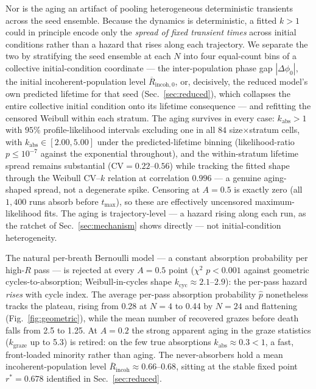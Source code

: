 \documentclass[pdflatex,sn-mathphys,Numbered]{sn-jnl}
\begin{document}
Nor is the aging an artifact of pooling heterogeneous deterministic transients
across the seed ensemble. Because the dynamics is deterministic, a fitted $k > 1$
could in principle encode only the \emph{spread of fixed transient times} across
initial conditions rather than a hazard that rises along each trajectory. We
separate the two by stratifying the seed ensemble at each $N$ into four
equal-count bins of a collective initial-condition coordinate --- the
inter-population phase gap $|\Delta\phi_0|$, the initial incoherent-population
level $\overline{R}_{\mathrm{incoh},0}$, or, decisively, the reduced model's own
predicted lifetime for that seed (Sec.~\ref{sec:reduced}), which collapses the
entire collective initial condition onto its lifetime consequence --- and
refitting the censored Weibull within each stratum. The aging survives in every
case: $k_{\mathrm{abs}} > 1$ with $95\%$ profile-likelihood intervals excluding
one in all $84$ size$\times$stratum cells, with
$k_{\mathrm{abs}} \in [2.00, 5.00]$ under the predicted-lifetime binning
(likelihood-ratio $p \le 10^{-7}$ against the exponential throughout), and the
within-stratum lifetime spread remains substantial
($\mathrm{CV} = 0.22$--$0.56$) while tracking the fitted shape through the
Weibull CV--$k$ relation at correlation $0.996$ --- a genuine aging-shaped spread,
not a degenerate spike. Censoring at $A = 0.5$ is exactly zero (all $1{,}400$
runs absorb before $t_{\max}$), so these are effectively uncensored
maximum-likelihood fits. The aging is trajectory-level --- a hazard rising along
each run, as the ratchet of Sec.~\ref{sec:mechanism} shows directly --- not
initial-condition heterogeneity.

The natural per-breath Bernoulli model
--- a constant absorption probability per high-$R$ pass --- is rejected at every
$A = 0.5$ point ($\chi^2$ $p < 0.001$ against geometric cycles-to-absorption;
Weibull-in-cycles shape $k_{\mathrm{cyc}} \approx 2.1$--$2.9$): the per-pass hazard
\emph{rises} with cycle index. The average per-pass absorption probability
$\hat p$ nonetheless tracks the plateau, rising from 0.28 at $N = 4$ to 0.44 by
$N = 24$ and flattening (Fig.~\ref{fig:geometric}), while the mean number of
recovered grazes before death falls from 2.5 to 1.25. At $A = 0.2$ the strong
apparent aging in the graze statistics ($k_{\mathrm{graze}}$ up to 5.3) is retired:
on the few true absorptions $k_{\mathrm{abs}} \approx 0.3 < 1$, a fast, front-loaded
minority rather than aging. The never-absorbers hold a mean incoherent-population
level $\overline{R}_{\mathrm{incoh}} \approx 0.66$--$0.68$, sitting at the stable
fixed point $r^* = 0.678$ identified in Sec.~\ref{sec:reduced}.
\end{document}
